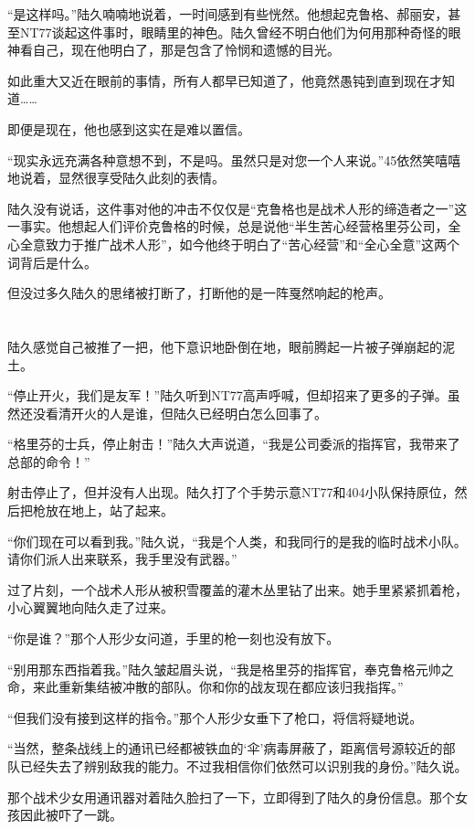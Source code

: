“是这样吗。”陆久喃喃地说着，一时间感到有些恍然。他想起克鲁格、郝丽安，甚至NT77谈起这件事时，眼睛里的神色。陆久曾经不明白他们为何用那种奇怪的眼神看自己，现在他明白了，那是包含了怜悯和遗憾的目光。

如此重大又近在眼前的事情，所有人都早已知道了，他竟然愚钝到直到现在才知道……

即便是现在，他也感到这实在是难以置信。

“现实永远充满各种意想不到，不是吗。虽然只是对您一个人来说。”45依然笑嘻嘻地说着，显然很享受陆久此刻的表情。

陆久没有说话，这件事对他的冲击不仅仅是“克鲁格也是战术人形的缔造者之一”这一事实。他想起人们评价克鲁格的时候，总是说他“半生苦心经营格里芬公司，全心全意致力于推广战术人形”，如今他终于明白了“苦心经营”和“全心全意”这两个词背后是什么。

但没过多久陆久的思绪被打断了，打断他的是一阵戛然响起的枪声。

\section*{}

陆久感觉自己被推了一把，他下意识地卧倒在地，眼前腾起一片被子弹崩起的泥土。

“停止开火，我们是友军！”陆久听到NT77高声呼喊，但却招来了更多的子弹。虽然还没看清开火的人是谁，但陆久已经明白怎么回事了。

“格里芬的士兵，停止射击！”陆久大声说道，“我是公司委派的指挥官，我带来了总部的命令！”

射击停止了，但并没有人出现。陆久打了个手势示意NT77和404小队保持原位，然后把枪放在地上，站了起来。

“你们现在可以看到我。”陆久说，“我是个人类，和我同行的是我的临时战术小队。请你们派人出来联系，我手里没有武器。”

过了片刻，一个战术人形从被积雪覆盖的灌木丛里钻了出来。她手里紧紧抓着枪，小心翼翼地向陆久走了过来。

“你是谁？”那个人形少女问道，手里的枪一刻也没有放下。

“别用那东西指着我。”陆久皱起眉头说，“我是格里芬的指挥官，奉克鲁格元帅之命，来此重新集结被冲散的部队。你和你的战友现在都应该归我指挥。”

“但我们没有接到这样的指令。”那个人形少女垂下了枪口，将信将疑地说。

“当然，整条战线上的通讯已经都被铁血的‘伞’病毒屏蔽了，距离信号源较近的部队已经失去了辨别敌我的能力。不过我相信你们依然可以识别我的身份。”陆久说。

那个战术少女用通讯器对着陆久脸扫了一下，立即得到了陆久的身份信息。那个女孩因此被吓了一跳。

